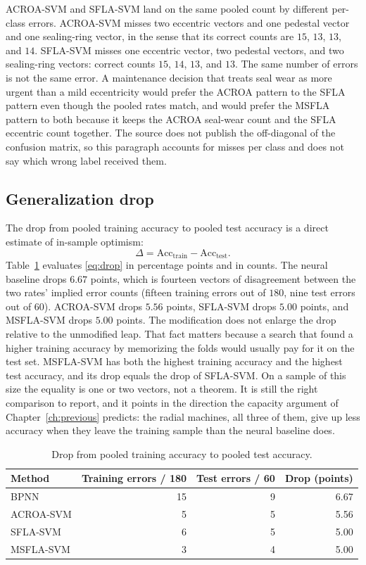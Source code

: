 ACROA-SVM and SFLA-SVM land on the same pooled count by different per-class errors.
ACROA-SVM misses two eccentric vectors and one pedestal vector and one sealing-ring vector, in the sense that its correct counts are \(15\), \(13\), \(13\), and \(14\).
SFLA-SVM misses one eccentric vector, two pedestal vectors, and two sealing-ring vectors: correct counts \(15\), \(14\), \(13\), and \(13\).
The same number of errors is not the same error.
A maintenance decision that treats seal wear as more urgent than a mild eccentricity would prefer the ACROA pattern to the SFLA pattern even though the pooled rates match, and would prefer the MSFLA pattern to both because it keeps the ACROA seal-wear count and the SFLA eccentric count together.
The source does not publish the off-diagonal of the confusion matrix, so this paragraph accounts for misses per class and does not say which wrong label received them.

\subsection{Generalization drop}

The drop from pooled training accuracy to pooled test accuracy is a direct estimate of in-sample optimism:
\begin{equation}
\Delta = \mathrm{Acc}_{\mathrm{train}}-\mathrm{Acc}_{\mathrm{test}}.
\label{eq:drop}
\end{equation}
Table~\ref{tab:drop} evaluates \eqref{eq:drop} in percentage points and in counts.
The neural baseline drops \(6.67\) points, which is fourteen vectors of disagreement between the two rates' implied error counts (fifteen training errors out of \(180\), nine test errors out of \(60\)).
ACROA-SVM drops \(5.56\) points, SFLA-SVM drops \(5.00\) points, and MSFLA-SVM drops \(5.00\) points.
The modification does not enlarge the drop relative to the unmodified leap.
That fact matters because a search that found a higher training accuracy by memorizing the folds would usually pay for it on the test set.
MSFLA-SVM has both the highest training accuracy and the highest test accuracy, and its drop equals the drop of SFLA-SVM.
On a sample of this size the equality is one or two vectors, not a theorem.
It is still the right comparison to report, and it points in the direction the capacity argument of Chapter~\ref{ch:previous} predicts: the radial machines, all three of them, give up less accuracy when they leave the training sample than the neural baseline does.

\begin{table}[H]
\centering
\caption{Drop from pooled training accuracy to pooled test accuracy.}
\label{tab:drop}
\begin{tabular}{lrrr}
\toprule
Method & Training errors / 180 & Test errors / 60 & Drop (points) \\
\midrule
BPNN & 15 & 9 & 6.67 \\
ACROA-SVM & 5 & 5 & 5.56 \\
SFLA-SVM & 6 & 5 & 5.00 \\
MSFLA-SVM & 3 & 4 & 5.00 \\
\bottomrule
\end{tabular}
\end{table}

